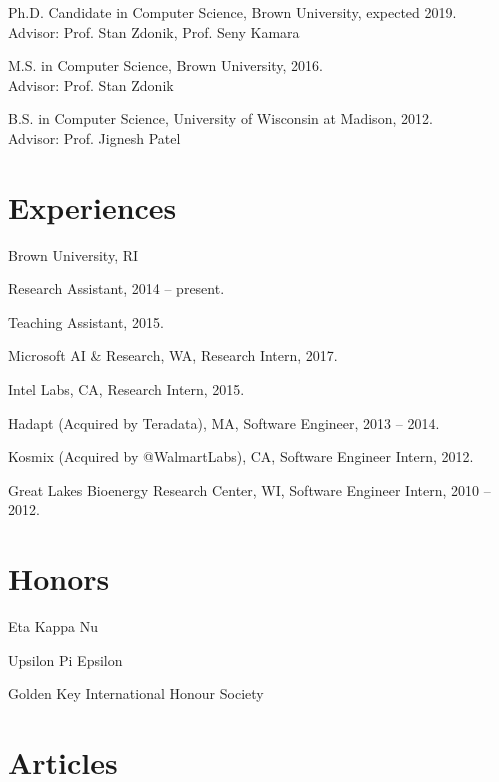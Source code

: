 \documentclass[letterpaper]{article}
\renewenvironment{itemize}{
  \begin{list}{}{
    \setlength{\leftmargin}{1.5em}
  }
}{
  \end{list}
}
\begin{document}
\begin{itemize}
  \item Ph.D. Candidate in Computer Science, Brown University, expected 2019.\\
  Advisor: Prof. Stan Zdonik, Prof. Seny Kamara
  \item M.S. in Computer Science, Brown University, 2016.\\
  Advisor: Prof. Stan Zdonik
  \item B.S. in Computer Science, University of Wisconsin at Madison, 2012.\\
  Advisor: Prof. Jignesh Patel
\end{itemize}


\section*{Experiences}

\begin{itemize}
\item Brown University, RI
	\begin{itemize}
		\item Research Assistant, 2014 -- present.
		\item Teaching Assistant, 2015.
	\end{itemize}
\item Microsoft AI \& Research, WA, Research Intern, 2017.
\item Intel Labs, CA, Research Intern, 2015.
\item Hadapt (Acquired by Teradata), MA, Software Engineer, 2013 -- 2014.
\item Kosmix (Acquired by @WalmartLabs), CA, Software Engineer Intern, 2012.
\item Great Lakes Bioenergy Research Center, WI, Software Engineer Intern, 2010 -- 2012.
\end{itemize}

\section*{Honors}
\begin{itemize}
\item Eta Kappa Nu
\item Upsilon Pi Epsilon
\item Golden Key International Honour Society
\end{itemize}

\section*{Articles}
\end{document}
